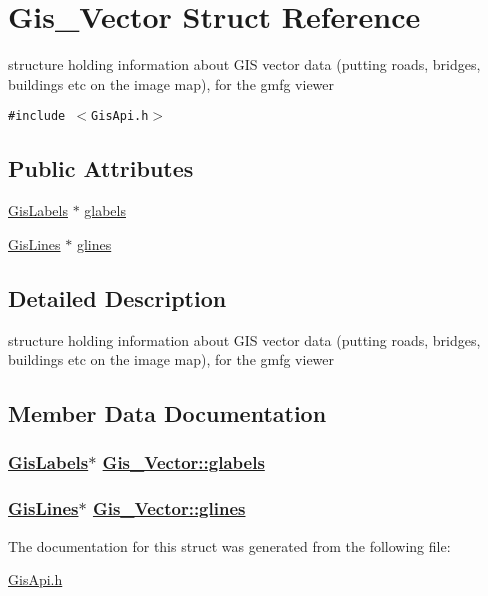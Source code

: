 \hypertarget{structGis__Vector}{
\section{Gis\_\-Vector Struct Reference}
\label{structGis__Vector}
}
structure holding information about GIS vector data (putting roads, bridges, buildings etc on the image map), for the gmfg viewer  


{\tt \#include $<$Gis\-Api.h$>$}

\subsection*{Public Attributes}
\begin{CompactItemize}
\item 
\hyperlink{classGisLabels}{Gis\-Labels} $\ast$ \hyperlink{structGis__Vector_o0}{glabels}
\item 
\hyperlink{classGisLines}{Gis\-Lines} $\ast$ \hyperlink{structGis__Vector_o1}{glines}
\end{CompactItemize}


\subsection{Detailed Description}
structure holding information about GIS vector data (putting roads, bridges, buildings etc on the image map), for the gmfg viewer 



\subsection{Member Data Documentation}
\hypertarget{structGis__Vector_o0}{
\subsubsection[glabels]{\setlength{\rightskip}{0pt plus 5cm}\hyperlink{classGisLabels}{Gis\-Labels}$\ast$ \hyperlink{structGis__Vector_o0}{Gis\_\-Vector::glabels}}}
\label{structGis__Vector_o0}


\hypertarget{structGis__Vector_o1}{
\subsubsection[glines]{\setlength{\rightskip}{0pt plus 5cm}\hyperlink{classGisLines}{Gis\-Lines}$\ast$ \hyperlink{structGis__Vector_o1}{Gis\_\-Vector::glines}}}
\label{structGis__Vector_o1}




The documentation for this struct was generated from the following file:\begin{CompactItemize}
\item 
\hyperlink{GisApi_8h}{Gis\-Api.h}\end{CompactItemize}
